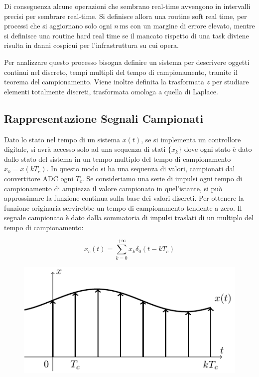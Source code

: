 \documentclass{article}
\numberwithin{equation}{subsection}
\begin{document}
Di conseguenza alcune operazioni che sembrano real-time avvengono in intervalli precisi per sembrare real-time. 
Si definisce allora una routine soft real time, per processi che si aggiornano solo ogni $n\,\mathrm{ms}$ con un margine di errore elevato, mentre si definisce una routine hard real 
time se il mancato rispetto di una task diviene risulta in danni cospicui per l'infrastruttura su cui opera. 


Per analizzare questo processo bisogna definire un sistema per descrivere oggetti continui nel discreto, tempi multipli del tempo di campionamento, tramite il teorema del 
campionamento. Viene inoltre definita la trasformata $z$ per studiare elementi totalmente discreti, trasformata omologa a quella di Laplace. 

\subsection{Rappresentazione Segnali Campionati}

Dato lo stato nel tempo di un sistema $x(t)$, se si implementa un controllore digitale, si avrà accesso solo ad una sequenza di stati $\{x_k\}$ dove ogni stato è dato dallo 
stato del sistema in un tempo multiplo del tempo di campionamento $x_k=x(kT_c)$. In questo modo si ha una sequenza di valori, campionati dal convertitore ADC ogni $T_c$. Se 
consideriamo una serie di impulsi ogni tempo di campionamento di ampiezza il valore campionato in quel'istante, si può approssimare la funzione continua sulla base dei 
valori discreti. Per ottenere la funzione originaria servirebbe un tempo di campionamento tendente a zero. Il segnale campionato è dato 
dalla sommatoria di impulsi traslati di un multiplo del tempo di campionamento:

\begin{equation}
    x_c(t)=\sum_{k=0}^{+\infty}x_k\delta_0(t-kT_c)
\end{equation}

\begin{figure}[H]%
    \centering
    \includegraphics{campionamento.pdf}%
\end{figure}
\end{document}
